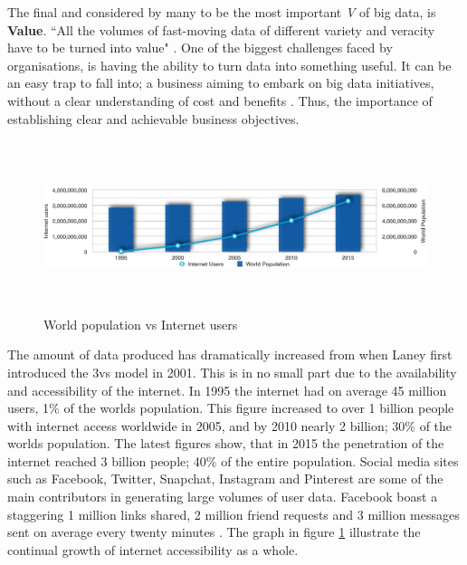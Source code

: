 The final and considered by many to be the most important \textit{V} of big data, is \textbf{Value}. ``All the volumes of fast-moving data of different variety and veracity have to be turned into value" \cite{ibm}. One of the biggest challenges faced by organisations, is having the ability to turn data into something useful. It can be an easy trap to fall into; a business aiming to embark on big data initiatives, without a clear understanding of cost and benefits \cite{bigdata}. Thus, the importance of establishing clear and achievable business objectives.

\begin{figure}[h]\begin{center}\includegraphics[height=5cm,width=1\linewidth]{images/worldpopgraph}\caption{World population vs Internet users}\label{fig:worldpop}\end{center}\end{figure}
The amount of data produced has dramatically increased from when Laney first introduced the 3vs model in 2001. This is in no small part due to the availability and accessibility of the internet. In 1995 the internet had on average 45 million users, 1\% of the worlds population. This figure increased to over 1 billion people with internet access worldwide in 2005, and by 2010 nearly 2 billion; 30\% of the worlds population. The latest figures show, that in 2015 the penetration of the internet reached 3 billion people; 40\% of the entire population. Social media sites such as Facebook, Twitter, Snapchat, Instagram and Pinterest are some of the main contributors in generating large volumes of user data. Facebook boast a staggering 1 million links shared, 2 million friend requests and 3 million messages sent on average every twenty minutes \cite{statref}. The graph in figure \ref{fig:worldpop} illustrate the continual growth of internet accessibility as a whole.


